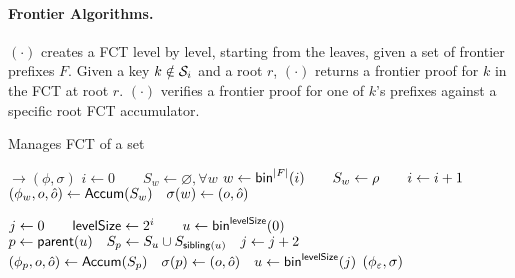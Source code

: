 \paragraph{Frontier Algorithms.}
{\createfrontier}$(\cdot)$ creates a FCT level by level, starting from the leaves, given a set of frontier prefixes $F$.
Given a key $k\notin \mathcal{S}_i$ and a root $r$, {\provefrontier}$(\cdot)$ returns a frontier proof for $k$ in the FCT at root $r$.
{\verfrontier}$(\cdot)$ verifies a frontier proof for one of $k$'s prefixes against a specific root FCT accumulator.
\begin{algorithm}[H]
    \begin{algorithmic}[1]
    \caption{\small Manages FCT of a set}
    \label{a:at:createfrontier}
    \label{a:at:provefrontier}
    \label{a:at:verfrontier}
     $\rightarrow (\phi,\sigma)$
        \State $i\gets 0\qquad S_w\gets \varnothing, \forall w$
         
            \State $w\gets \mathsf{bin}^{|F|}(i)\qquad S_w \gets \rho\qquad i\gets i+1$
            \State $(\phi_w,o,\hat{o}) \gets \mathsf{Accum}(S_w)\quad \sigma(w) \gets (o, \hat{o})$
        \EndFor

         
            \State $j\gets 0\qquad \mathsf{levelSize} \gets 2^i\qquad u\gets \mathsf{bin}^{\mathsf{levelSize}}(0)$
             
                \State $p \gets \mathsf{parent}(u)\quad S_p \gets S_u\cup S_{\mathsf{sibling}(u)} \quad j \gets j+2$
                \State $(\phi_p,o,\hat{o}) \gets \mathsf{Accum}(S_p)\quad \sigma(p) \gets (o, \hat{o})\quad u \gets \mathsf{bin}^\mathsf{levelSize}(j)$
            \EndWhile
        \EndFor
        \State \Return $( \phi_\varepsilon, \sigma)$
    \EndFunction


\end{algorithmic}
\end{algorithm}

